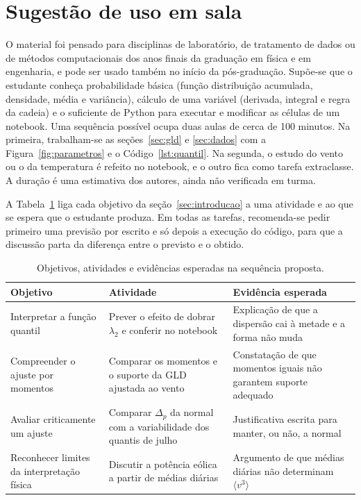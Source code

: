 
\section{Sugestão de uso em sala}\label{sec:roteiro}

O material foi pensado para disciplinas de laboratório, de tratamento de dados ou de métodos computacionais dos anos finais da graduação em física e em engenharia, e pode ser usado também no início da pós-graduação. Supõe-se que o estudante conheça probabilidade básica (função distribuição acumulada, densidade, média e variância), cálculo de uma variável (derivada, integral e regra da cadeia) e o suficiente de Python para executar e modificar as células de um notebook. Uma sequência possível ocupa duas aulas de cerca de 100 minutos. Na primeira, trabalham-se as seções~\ref{sec:gld} e \ref{sec:dados} com a Figura~\ref{fig:parametros} e o Código~\ref{lst:quantil}. Na segunda, o estudo do vento ou o da temperatura é refeito no notebook, e o outro fica como tarefa extraclasse. A duração é uma estimativa dos autores, ainda não verificada em turma.

A Tabela~\ref{tab:roteiro} liga cada objetivo da seção~\ref{sec:introducao} a uma atividade e ao que se espera que o estudante produza. Em todas as tarefas, recomenda-se pedir primeiro uma previsão por escrito e só depois a execução do código, para que a discussão parta da diferença entre o previsto e o obtido.

\begin{table}[htbp]
\centering
\caption{Objetivos, atividades e evidências esperadas na sequência proposta.}
\label{tab:roteiro}
\small
\begin{tabular}{p{3.6cm} p{5.4cm} p{5.0cm}}
\toprule
\textbf{Objetivo} & \textbf{Atividade} & \textbf{Evidência esperada} \\
\midrule
Interpretar a função quantil & Prever o efeito de dobrar $\lambda_2$ e conferir no notebook & Explicação de que a dispersão cai à metade e a forma não muda \\
Compreender o ajuste por momentos & Comparar os momentos e o suporte da GLD ajustada ao vento & Constatação de que momentos iguais não garantem suporte adequado \\
Avaliar criticamente um ajuste & Comparar $\Delta_p$ da normal com a variabilidade dos quantis de julho & Justificativa escrita para manter, ou não, a normal \\
Reconhecer limites da interpretação física & Discutir a potência eólica a partir de médias diárias & Argumento de que médias diárias não determinam $\langle v^3\rangle$ \\
\bottomrule
\end{tabular}
\end{table}

